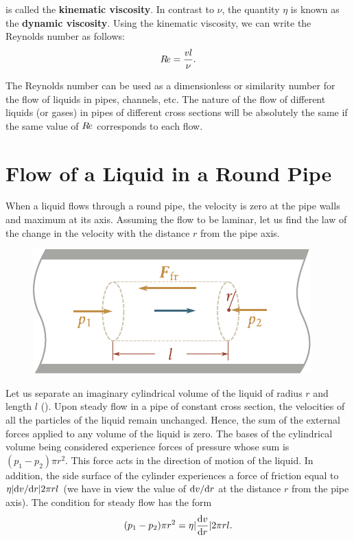 \noindent
is called the \textbf{kinematic viscosity}. In contrast to $\nu$, the quantity $\eta$ is known as the \textbf{dynamic viscosity}. Using the kinematic viscosity, we can write the Reynolds number as follows:
\begin{equation}\label{eq:9_15}
	R\hspace{-1pt}e = \frac{vl}{\nu}.
\end{equation}

\noindent
The Reynolds number can be used as a dimensionless or similarity number for the flow of liquids in pipes, channels, etc. The nature of the flow of different liquids (or gases) in pipes of different cross sections will be absolutely the same if the same value of $R\hspace{-1pt}e$ corresponds to each flow.

\section{Flow of a Liquid in a Round Pipe}\label{sec:9_6}

When a liquid flows through a round pipe, the velocity is zero at the pipe walls and maximum at its axis. Assuming the flow to be laminar, let us find the law of the change in the velocity with the distance $r$ from the pipe axis.

\begin{figure}[t]
	\begin{center}
		\includegraphics[scale=1.0]{figures/ch_09/fig_9_10.pdf}
		\caption[]{}
		\label{fig:9_10}
	\end{center}
	\vspace{-0.8cm}
\end{figure}

Let us separate an imaginary cylindrical volume of the liquid of radius $r$ and length $l$ (). Upon steady flow in a pipe of constant cross section, the velocities of all the particles of the liquid remain unchanged. Hence, the sum of the external forces applied to any volume of the liquid is zero. The bases of the cylindrical volume being considered experience forces of pressure whose sum is $(p_1-p_2)\pi r^2$. This force acts in the direction of motion of the liquid. In addition, the side surface of the cylinder experiences a force of friction equal to $\eta|\mathrm{d} v/\mathrm{d} r|2\pi rl$ (we have in view the value of $\mathrm{d} v/\mathrm{d} r$ at the distance $r$ from the pipe axis). The condition for steady flow has the form
\begin{equation}\label{eq:9_16}
	(p_1 - p_2)\pi r^2 = \eta|\frac{\mathrm{d} v}{\mathrm{d} r}|2\pi rl.
\end{equation}

